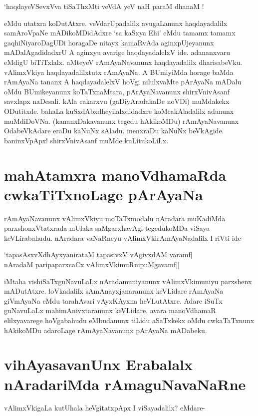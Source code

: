 \begin{shloka} 
`haqdayeVSevxVva tiSaThxMti veVdA yeV naH paraM dhanaM !\label{162b}
\end{shloka} 

eMdu utatxra koDutAtxre. veVdarUpadalilx avugaLanunx haqdayadalilx samAroVpaNe mADikoMDidAdxre `sa kaSxya Ehi'\label{162a} eMdu tamamx tamamx gaqhiNiyaroDagUDi horagaDe nitayx kamaRvAda aginxpUjeyanunx mADalAgadidadxrU A aginxyu avarige haqdayadalelxV ide. adananxvaru eMdigU biTiTxlalx. aMteyeV rAmAyaNavanunx haqdayadalilx dharisabeVku. vAlimxVkiya haqdayadalilxtutx rAmAyaNa. A BUmiyiMda horage baMda rAmAyaNa tananx A haqdayadalelxV hoVgi nilulxvaMte pArAyaNa mADalu oMdu BUmikeyanunx koTaTxnaMtara, pArAyaNavanunx shirxVnivAsanf savxlapx naDesali. kAla cakarxvu (gaDiyAradakaDe noVDi) muMdakekx ODutitxde. bahaLa kuSxdAbxdheyilalxdidadxre koMcakAladalilx adanunx muMdiDoVNa. (kananxDakavanunx tegedu hAkikoMDu) rAmAyaNavanunx OdabeVkAdare eraDu kaNuNx sAladu. inenxraDu kaNuNx beVkAgide. baninxVpApx! shirxVnivAsanf muMde kuLitukoLiLx. 

\section*{mahAtamxra manoVdhamaRda cwkaTiTxnoLage pArAyaNa} 

rAmAyaNavanunx vAlimxVkiyu moTaTxmodalu nAradara muKadiMda parxshonxVtatxrada mUlaka saMgarxhavAgi tegedukoMDa viSaya keVLirabahudu. nAradara vaNaRneyu vAlimxVkirAmAyaNadalilx I riVti ide- 

\begin{shloka} 
`tapasAsxvXdhAyxyanirataM tapasivxV vAgivxdAM varamf|\label{162}\\ 
nAradaM paripaparxcaCx vAlimxVkimuRnipuMgavamf||
\end{shloka} 

iMtaha vishiSaTxguNavuLaLx nAradamuniyanunx vAlimxVkimuniyu parxshenx mADutAtxre. loVkadalilx sAmAnayxjanaranunx keVLidare rAmAyaNa giVmAyaNa eMdu tarahAvari vAyxKAyxna heVLutAtxre. Adare iSuTx guNavuLaLx mahimAnivxtaranunx keVLidare, avara manoVdhamaR elilxyavarege hoVgabahudu eMbudanunx tiLidu aSaTxkekx oMdu cwkaTaTxnunx hAkikoMDu adaroLage rAmAyaNavanunx pArAyaNa mADabeku. 

\section*{vihAyasavanUnx Erabalalx nAradariMda rAmaguNavaNaRne} 

vAlimxVkigaLa kutUhala heVgitatxpApx I viSayadalilx? eMdare- 

